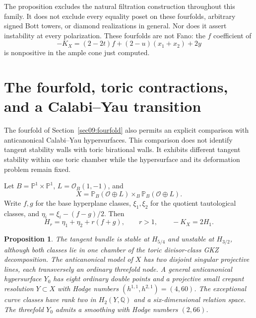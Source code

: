 \documentclass[11pt]{amsart}
\newtheorem{proposition}[theorem]{Proposition}
\theoremstyle{definition}
\theoremstyle{remark}
\newcommand{\PP}{\mathbb P}
\newcommand{\cO}{\mathcal O}
\begin{document}
The proposition excludes the natural filtration construction throughout
this family. It does not exclude every equality poset on these
fourfolds, arbitrary signed Bott towers, or diamond realizations in
general. Nor does it assert instability at every polarization.
These fourfolds are not Fano: the $f$ coefficient of
\[
 -K_X=(2-2t)f+(2-u)(x_1+x_2)+2y
\]
is nonpositive in the ample cone just computed.

\appendix
\section{The fourfold, toric contractions, and a Calabi--Yau transition}
\label{sec11:cy}

The fourfold of Section~\ref{sec09:fourfold} also permits an explicit
comparison with anticanonical Calabi--Yau hypersurfaces. This comparison
does not identify tangent stability walls with toric birational walls.
It exhibits different tangent stability within one toric chamber while
the hypersurface and its deformation problem remain fixed.

Let $B=\PP^1\times\PP^1$, $L=\cO_B(1,-1)$, and
\[
 X=\PP_B(\cO\oplus L)\times_B\PP_B(\cO\oplus L).
\]
Write $f,g$ for the base hyperplane classes, $\xi_1,\xi_2$ for the
quotient tautological classes, and $\eta_i=\xi_i-(f-g)/2$. Then
\[
 H_r=\eta_1+\eta_2+r(f+g),\qquad r>1,\qquad -K_X=2H_1.
\]

\begin{proposition}\label{prop11:transition}
The tangent bundle is stable at $H_{5/4}$ and unstable at $H_{3/2}$,
although both classes lie in one chamber of the toric divisor-class
GKZ decomposition. The anticanonical model of $X$ has two disjoint
singular projective lines, each transversely an ordinary threefold node.
A general anticanonical hypersurface $Y_0$ has eight ordinary double
points and a projective small crepant resolution $Y\subset X$ with
Hodge numbers $(h^{1,1},h^{2,1})=(4,60)$. The exceptional curve classes
have rank two in $H_2(Y,\mathbb Q)$ and a six-dimensional relation
space. The threefold $Y_0$ admits a smoothing with Hodge numbers
$(2,66)$.
\end{proposition}
\end{document}

